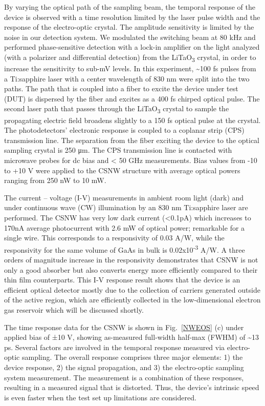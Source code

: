 By varying the optical path of the sampling beam, the temporal response of the
device is observed with a time resolution limited by the laser pulse width and
the response of the electro-optic crystal. The amplitude sensitivity is limited
by the noise in our detection system. We modulated the switching beam at 80 kHz
and performed phase-sensitive detection with a lock-in amplifier on the light
analyzed (with a polarizer and differential detection) from the
LiTaO\textsubscript{3} crystal, in order to increase the sensitivity to sub-mV
levels. In this experiment, \textasciitilde{}100 fs pulses from a Ti:sapphire
laser with a center wavelength of 830 nm were split into the two paths. The
path that is coupled into a fiber to excite the device under test (DUT) is
dispersed by the fiber and excites as a 400 fs chirped optical pulse.  The
second laser path that passes through the LiTaO\textsubscript{3} crystal to
sample the propagating electric field broadens slightly to a 150 fs optical
pulse at the crystal. The photodetectors' electronic response is coupled to a
coplanar strip (CPS) transmission line. The separation from the fiber exciting
the device to the optical sampling crystal is 250 μm. The CPS transmission line
is contacted with microwave probes for dc bias and \textless{} 50 GHz
measurements. Bias values from -10 to +10 V were applied to the CSNW structure
with average optical powers ranging from 250 nW to 10 mW.

The current -- voltage (I-V) measurements in ambient room light (dark)
and under continuous wave (CW) illumination by an 830 nm Ti:sapphire
laser are performed. The CSNW has very low dark current
(\textless{}0.1pA) which increases to 170nA average photocurrent with
2.6 mW of optical power; remarkable for a single wire. This corresponds
to a responsivity of 0.03 A/W, while the responsivity for the same
volume of GaAs in bulk is 0.02x10\textsuperscript{-3} A/W. A three
orders of magnitude increase in the responsivity demonstrates that CSNW
is not only a good absorber but also converts energy more efficiently
compared to their thin film counterparts. This I-V response result shows
that the device is an efficient optical detector mostly due to the
collection of carriers generated outside of the active region, which are
efficiently collected in the low-dimensional electron gas reservoir
which will be discussed shortly.

The time response data for the CSNW is shown in Fig.~\ref{NWEOS} (c) under
applied bias of ±10 V, showing as-measured full-width half-max (FWHM) of
\textasciitilde{}13 ps. Several factors are involved in the temporal response
measured via electro-optic sampling. The overall response comprises three major
elements: 1) the device response, 2) the signal propagation, and 3) the
electro-optic sampling system measurement. The measurement is a combination of
these responses, resulting in a measured signal that is distorted. Thus, the
device's intrinsic speed is even faster when the test set up limitations are
considered.

